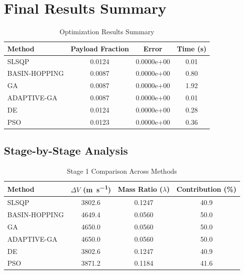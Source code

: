 \documentclass{article}
\begin{document}
\section{Final Results Summary}
\begin{table}[H]
\centering
\caption{Optimization Results Summary}
\begin{tabular}{lS[table-format=1.4]S[table-format=1.4e-1]S[table-format=1.2]}
\toprule
Method & {Payload Fraction} & {Error} & {Time (\si{\second})} \\
\midrule
SLSQP        & 0.0124 & 0.0000e+00 & 0.01 \\
BASIN-HOPPING & 0.0087 & 0.0000e+00 & 0.80 \\
GA           & 0.0087 & 0.0000e+00 & 1.92 \\
ADAPTIVE-GA  & 0.0087 & 0.0000e+00 & 0.01 \\
DE           & 0.0124 & 0.0000e+00 & 0.28 \\
PSO          & 0.0123 & 0.0000e+00 & 0.36 \\
\bottomrule
\end{tabular}
\end{table}

\subsection{Stage-by-Stage Analysis}


\begin{table}[H]
\centering
\caption{Stage 1 Comparison Across Methods}
\begin{tabular}{lS[table-format=4.1]S[table-format=1.4]S[table-format=3.1]}
\toprule
Method & {$\Delta V$ (\si{\meter\per\second})} & {Mass Ratio ($\lambda$)} & {Contribution (\%)} \\
\midrule
SLSQP        & 3802.6 & 0.1247 & 40.9 \\
BASIN-HOPPING & 4649.4 & 0.0560 & 50.0 \\
GA           & 4650.0 & 0.0560 & 50.0 \\
ADAPTIVE-GA  & 4650.0 & 0.0560 & 50.0 \\
DE           & 3802.6 & 0.1247 & 40.9 \\
PSO          & 3871.2 & 0.1184 & 41.6 \\
\bottomrule
\end{tabular}
\end{table}
\end{document}
